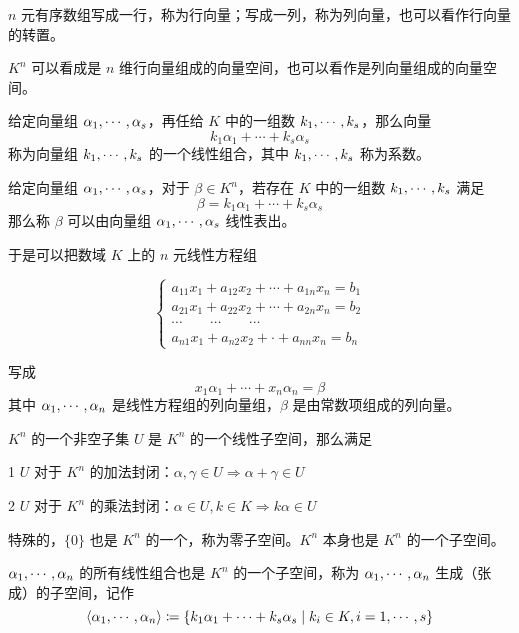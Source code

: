 $n$ 元有序数组写成一行，称为行向量；写成一列，称为列向量，也可以看作行向量的转置。

$K^n$ 可以看成是 $n$ 维行向量组成的向量空间，也可以看作是列向量组成的向量空间。

\begin{definition}[线性组合]
	给定向量组 $\alpha_1,\cdots,\alpha_s$，再任给 $K$ 中的一组数 $k_1,\cdots,k_s$，那么向量
	\[k_1 \alpha_1+\cdots+k_s \alpha_s\]
	称为向量组 $k_1,\cdots,k_s$ 的一个线性组合，其中 $k_1,\cdots,k_s$ 称为系数。
\end{definition}

\begin{definition}[线性表出]
	给定向量组 $\alpha_1,\cdots,\alpha_s$，对于 $\beta \in K^n$，若存在 $K$ 中的一组数 $k_1,\cdots,k_s$ 满足
	\[\beta = k_1\alpha_1+\cdots+k_s\alpha_s\]
	那么称 $\beta$ 可以由向量组 $\alpha_1,\cdots,\alpha_s$ 线性表出。
\end{definition}

于是可以把数域 $K$ 上的 $n$ 元线性方程组

\begin{equation*}
	\left\{
		\begin{matrix}
			a_{11}x_1+a_{12}x_2+\cdots+a_{1n}x_n=b_1\\
			a_{21}x_1+a_{22}x_2+\cdots+a_{2n}x_n=b_2\\
			\cdots\qquad\cdots\qquad\cdots\\
			a_{n1}x_1+a_{n2}x_2+\cdot +a_{nn}x_n=b_n
		\end{matrix}
	\right.
\end{equation*}

写成
\[x_1\alpha_1+\cdots+x_n\alpha_n=\beta\]
其中 $\alpha_1,\cdots,\alpha_n$ 是线性方程组的列向量组，$\beta$ 是由常数项组成的列向量。

\begin{definition}[线性子空间]
	$K^n$ 的一个非空子集 $U$ 是 $K^n$ 的一个线性子空间，那么满足
	
	\num{1} $U$ 对于 $K^n$ 的加法封闭：$\alpha,\gamma\in U \Rightarrow \alpha+\gamma \in U$

	\num{2} $U$ 对于 $K^n$ 的乘法封闭：$\alpha \in U,k\in K \Rightarrow k\alpha \in U$
\end{definition}

特殊的，$\{0\}$ 也是 $K^n$ 的一个，称为零子空间。$K^n$ 本身也是 $K^n$ 的一个子空间。

$\alpha_1,\cdots,\alpha_n$ 的所有线性组合也是 $K^n$ 的一个子空间，称为 $\alpha_1,\cdots,\alpha_n$ 生成（张成）的子空间，记作
\[\langle \alpha_1,\cdots,\alpha_n\rangle\coloneqq \{k_1\alpha_1+\cdots+k_s\alpha_s \mid k_i\in K,i=1,\cdots,s\}\]

